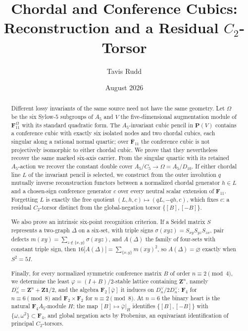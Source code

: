 \documentclass[11pt]{article}
\title{Chordal and Conference Cubics:\\
Reconstruction and a Residual \(C_2\)-Torsor}
\author{Tavis Rudd}
\date{August 2026}
\theoremstyle{definition}
\theoremstyle{remark}
\newcommand{\F}{\mathbf F}
\newcommand{\Z}{\mathbf Z}
\newcommand{\PP}{\mathbf P}
\begin{document}
\maketitle

\begin{abstract}
Different lossy invariants of the same source need not have the same
geometry.  Let \(\Omega\) be the six Sylow-\(5\) subgroups of \(A_5\) and
\(V\) the five-dimensional augmentation module of \(\F_{11}^{\Omega}\) with
its standard quadratic form.  The \(A_5\)-invariant cubic pencil in
\(\PP(V)\) contains a conference cubic with exactly six isolated nodes and two
chordal cubics, each singular along a rational normal quartic; over
\(\overline{\F}_{11}\) the conference cubic is not projectively isomorphic
to either chordal cubic.  We prove that they nevertheless recover the same
marked six-axis carrier.  From the singular quartic with its retained
\(A_5\)-action we recover the constant double cover
\(A_5/C_5\to\Omega=A_5/D_{10}\).  If either chordal line \(L\)
of the invariant pencil is selected, we construct from the outer involution
\(q\) mutually inverse reconstruction functors between a normalized chordal
generator \(h\in L\) and a chosen-sign conference generator \(c\) over every
neutral scalar extension of \(\F_{11}\).  Forgetting
\(L\) is exactly the free quotient \((L,h,c)\mapsto(qL,-qh,c)\), which fixes
\(c\): a residual \(C_2\)-torsor distinct from the global-negation torsor
\(\{[B],[-B]\}\).

We also prove an intrinsic six-point recognition criterion.  If a Seidel
matrix \(S\) represents a two-graph \(\Delta\) on a six-set, with triple
signs \(\sigma(xyz)=S_{xy}S_{yz}S_{zx}\), pair defects
\(m(xy)=\sum_{z\notin\{x,y\}}\sigma(xyz)\), and \(A(\Delta)\) the family of
four-sets with constant triple sign, then
\(16|A(\Delta)|=\sum_{\{x,y\}}m(xy)^2\), so \(A(\Delta)=\varnothing\)
exactly when \(S^2=5I\).

Finally, for every normalized symmetric conference matrix \(B\) of order
\(n\equiv2\pmod4\), we determine the least \(\varphi=(I+B)/2\)-stable
lattice containing \(\Z^n\), namely \(D_n^\vee=\Z^n+\Z\mathbf1/2\), and the
algebra \(\F_2[\bar\varphi]\) it induces on \(D_n^\vee/2D_n^\vee\):
\(\F_4\) for \(n\equiv6\pmod8\) and \(\F_2\times\F_2\) for
\(n\equiv2\pmod8\).  At \(n=6\) the binary heart is the natural
\(\F_4A_5\)-module \(H\); the map \([B]\mapsto\bar\varphi|_H\) identifies
\(\{[B],[-B]\}\) with \(\{\omega,\omega^2\}\subset\F_4\), and global
negation acts by Frobenius, an equivariant identification of principal
\(C_2\)-torsors.
\end{abstract}
\end{document}
